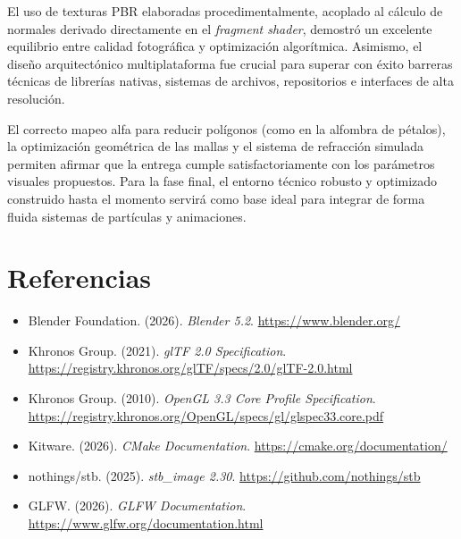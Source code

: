 \documentclass[letter,11pt]{article}
\begin{document}
	El uso de texturas PBR elaboradas procedimentalmente, acoplado al cálculo de normales derivado directamente en el \textit{fragment shader}, demostró un excelente equilibrio entre calidad fotográfica y optimización algorítmica. Asimismo, el diseño arquitectónico multiplataforma fue crucial para superar con éxito barreras técnicas de librerías nativas, sistemas de archivos, repositorios e interfaces de alta resolución. 
	
	El correcto mapeo alfa para reducir polígonos (como en la alfombra de pétalos), la optimización geométrica de las mallas y el sistema de refracción simulada permiten afirmar que la entrega cumple satisfactoriamente con los parámetros visuales propuestos. Para la fase final, el entorno técnico robusto y optimizado construido hasta el momento servirá como base ideal para integrar de forma fluida sistemas de partículas y animaciones.
	
	\section{Referencias}
	\begin{itemize}[leftmargin=*]
		\item Blender Foundation. (2026). \textit{Blender 5.2}. \url{https://www.blender.org/}
		\item Khronos Group. (2021). \textit{glTF 2.0 Specification}. \url{https://registry.khronos.org/glTF/specs/2.0/glTF-2.0.html}
		\item Khronos Group. (2010). \textit{OpenGL 3.3 Core Profile Specification}. \url{https://registry.khronos.org/OpenGL/specs/gl/glspec33.core.pdf}
		\item Kitware. (2026). \textit{CMake Documentation}. \url{https://cmake.org/documentation/}
		\item nothings/stb. (2025). \textit{stb\_image 2.30}. \url{https://github.com/nothings/stb}
		\item GLFW. (2026). \textit{GLFW Documentation}. \url{https://www.glfw.org/documentation.html}
	\end{itemize}
\end{document}
